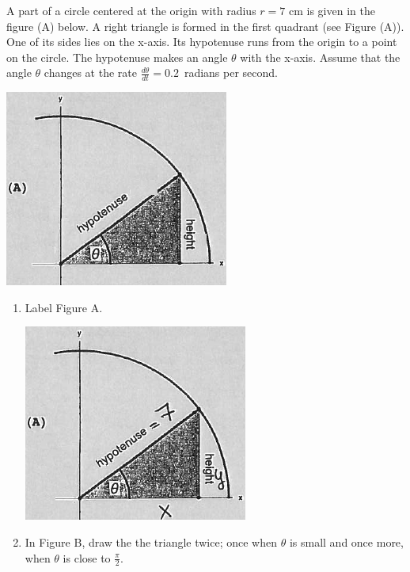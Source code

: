 \documentclass[nooutcomes]{ximera}
\begin{document}
\begin{problem}
A part of a circle centered at the origin with radius $r=7$ cm is given in the figure (A) below.  A right triangle is formed in the first quadrant (see Figure (A)).  One of its sides lies on the x-axis.  Its hypotenuse runs from the origin to a point on the circle.  The hypotenuse makes an angle $\theta$ with the x-axis.  Assume that the angle $\theta$ changes at the rate $\frac{d\theta}{dt}=0.2$\ radians per second.
	\begin{image}
	\includegraphics[scale=.5]{Figure10.png}
	\end{image}
	
\begin{enumerate}
	\item Label Figure A.
		\begin{freeResponse} \hfil
		\begin{image}
	\includegraphics[scale=.5]{Figure11.png}
	\end{image}
		\end{freeResponse}
	\item In Figure B, draw the the triangle twice; once when $\theta$ is small and once more, when $\theta$ is close to $\frac{\pi}{2}$.


\end{enumerate}
\end{problem}
\end{document}
